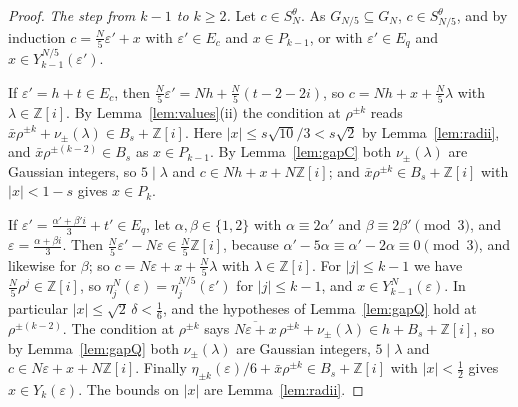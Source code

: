 \documentclass[11pt,a4paper]{amsart}
\theoremstyle{remark}
\newcommand{\Z}{\mathbb{Z}}
\begin{document}
\begin{proof}
\emph{The step from $k-1$ to $k\ge2$.} Let $c\in S_N^\theta$. As $G_{N/5}\subseteq G_N$, $c\in S_{N/5}^\theta$, and by
induction $c=\frac N5\varepsilon'+x$ with $\varepsilon'\in E_c$ and $x\in P_{k-1}$, or with $\varepsilon'\in E_q$ and
$x\in Y^{N/5}_{k-1}(\varepsilon')$.

If $\varepsilon'=h+t\in E_c$, then $\frac N5\varepsilon'=Nh+\frac N5(t-2-2i)$, so $c=Nh+x+\frac N5\lambda$ with
$\lambda\in\Z[i]$. By Lemma~\ref{lem:values}(ii) the condition at $\rho^{\pm k}$ reads $\bar x\rho^{\pm k}+
\nu_\pm(\lambda)\in B_s+\Z[i]$. Here $|x|\le s\sqrt{10}/3<s\sqrt2$ by Lemma~\ref{lem:radii}, and $\bar
x\rho^{\pm(k-2)}\in B_s$ as $x\in P_{k-1}$. By Lemma~\ref{lem:gapC} both $\nu_\pm(\lambda)$ are Gaussian integers,
so $5\mid\lambda$ and $c\in Nh+x+N\Z[i]$; and $\bar x\rho^{\pm k}\in B_s+\Z[i]$ with $|x|<1-s$ gives $x\in P_k$.

If $\varepsilon'=\frac{\alpha'+\beta'i}3+t'\in E_q$, let $\alpha,\beta\in\{1,2\}$ with $\alpha\equiv2\alpha'$ and
$\beta\equiv2\beta'\pmod3$, and $\varepsilon=\frac{\alpha+\beta i}3$. Then $\frac N5\varepsilon'-N\varepsilon\in\frac
N5\Z[i]$, because $\alpha'-5\alpha\equiv\alpha'-2\alpha\equiv0\pmod3$, and likewise for $\beta$; so
$c=N\varepsilon+x+\frac N5\lambda$ with $\lambda\in\Z[i]$. For $|j|\le k-1$ we have $\frac N5\rho^j\in\Z[i]$, so
$\eta^N_j(\varepsilon)=\eta^{N/5}_j(\varepsilon')$ for $|j|\le k-1$, and $x\in Y^N_{k-1}(\varepsilon)$. In
particular $|x|\le\sqrt2\,\delta<\frac16$, and the hypotheses of Lemma~\ref{lem:gapQ} hold at $\rho^{\pm(k-2)}$. The
condition at $\rho^{\pm k}$ says $\overline{N\varepsilon+x}\,\rho^{\pm k}+\nu_\pm(\lambda)\in h+B_s+\Z[i]$, so
by Lemma~\ref{lem:gapQ} both $\nu_\pm(\lambda)$ are Gaussian integers, $5\mid\lambda$ and $c\in N\varepsilon+x+N\Z[i]$.
Finally $\eta_{\pm k}(\varepsilon)/6+\bar x\rho^{\pm k}\in B_s+\Z[i]$ with $|x|<\frac12$ gives $x\in Y_k(\varepsilon)$.
The bounds on $|x|$ are Lemma~\ref{lem:radii}.
\end{proof}
\end{document}
